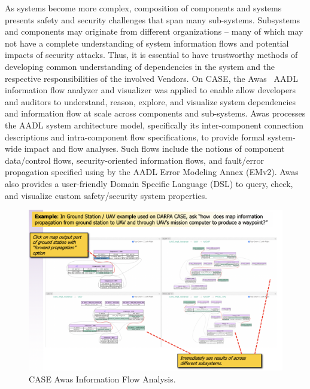 
As systems become more complex, composition of components and 
systems presents safety and security challenges that span
many sub-systems.  Subsystems and components may originate from
different organizations -- many of which may not have a complete
understanding of system information flows and potential impacts of
security attacks.  Thus, it is essential to have trustworthy methods
of developing common understanding of dependencies in the system and
the respective responsibilities of the involved Vendors.  On CASE, the
Awas~\cite{awas} AADL information flow analyzer and visualizer was
applied to enable allow developers and auditors to understand, reason,
explore, and visualize system dependencies and information flow at
scale across components and sub-systems.  Awas processes the AADL
system architecture model, specifically its inter-component connection
descriptions and intra-component flow specifications, to provide
formal system-wide impact and flow analyses.
Such flows include the notions of component data/control flows,
security-oriented information flows, and fault/error propagation
specified using by the AADL Error Modeling Annex (EMv2).
Awas also provides a user-friendly Domain Specific Language (DSL) to 
query, check, and visualize custom safety/security system properties.

\begin{figure}[h]
	\centering
	\includegraphics[width=\columnwidth]{figs/CASE-Awas.png}
	\caption{CASE Awas Information Flow Analysis.} 
	\label{fig:CASE-Awas} 
\end{figure}

